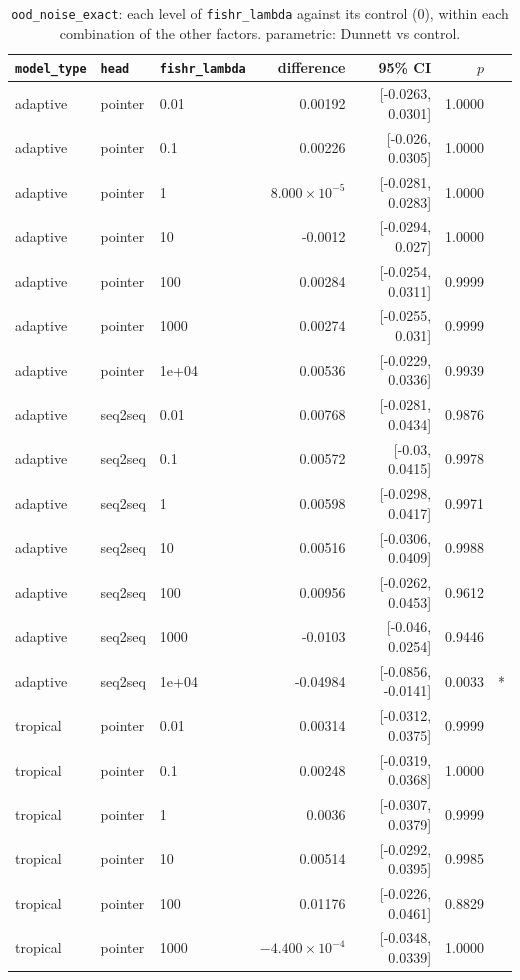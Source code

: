 \documentclass[10pt]{article}
\begin{document}
{\small
\begin{longtable}{lllrrrl}
\caption{\texttt{ood\_noise\_exact}: each level of \texttt{fishr\_lambda} against its control (0), within each combination of the other factors. parametric: Dunnett vs control.}\label{tab:control-ood_noise_exact}\\
\toprule
\texttt{model\_type} & \texttt{head} & \texttt{fishr\_lambda} & difference & 95\% CI & $p$ & \\
\midrule
\endhead
adaptive & pointer & 0.01 & 0.00192 & [-0.0263, 0.0301] & 1.0000 & \\
adaptive & pointer & 0.1 & 0.00226 & [-0.026, 0.0305] & 1.0000 & \\
adaptive & pointer & 1 & $8.000\times10^{-5}$ & [-0.0281, 0.0283] & 1.0000 & \\
adaptive & pointer & 10 & -0.0012 & [-0.0294, 0.027] & 1.0000 & \\
adaptive & pointer & 100 & 0.00284 & [-0.0254, 0.0311] & 0.9999 & \\
adaptive & pointer & 1000 & 0.00274 & [-0.0255, 0.031] & 0.9999 & \\
adaptive & pointer & 1e+04 & 0.00536 & [-0.0229, 0.0336] & 0.9939 & \\
adaptive & seq2seq & 0.01 & 0.00768 & [-0.0281, 0.0434] & 0.9876 & \\
adaptive & seq2seq & 0.1 & 0.00572 & [-0.03, 0.0415] & 0.9978 & \\
adaptive & seq2seq & 1 & 0.00598 & [-0.0298, 0.0417] & 0.9971 & \\
adaptive & seq2seq & 10 & 0.00516 & [-0.0306, 0.0409] & 0.9988 & \\
adaptive & seq2seq & 100 & 0.00956 & [-0.0262, 0.0453] & 0.9612 & \\
adaptive & seq2seq & 1000 & -0.0103 & [-0.046, 0.0254] & 0.9446 & \\
adaptive & seq2seq & 1e+04 & -0.04984 & [-0.0856, -0.0141] & 0.0033 & *\\
tropical & pointer & 0.01 & 0.00314 & [-0.0312, 0.0375] & 0.9999 & \\
tropical & pointer & 0.1 & 0.00248 & [-0.0319, 0.0368] & 1.0000 & \\
tropical & pointer & 1 & 0.0036 & [-0.0307, 0.0379] & 0.9999 & \\
tropical & pointer & 10 & 0.00514 & [-0.0292, 0.0395] & 0.9985 & \\
tropical & pointer & 100 & 0.01176 & [-0.0226, 0.0461] & 0.8829 & \\
tropical & pointer & 1000 & $-4.400\times10^{-4}$ & [-0.0348, 0.0339] & 1.0000 & \\

\end{longtable}}
\end{document}
